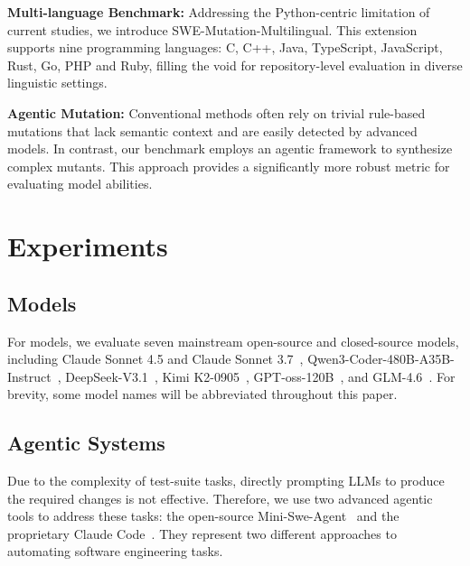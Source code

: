 \documentclass[11pt]{article}
\begin{document}
\textbf{Multi-language Benchmark:} Addressing the Python-centric limitation of current studies, we introduce SWE-Mutation-Multilingual. This extension supports nine programming languages: C, C++, Java, TypeScript, JavaScript, Rust, Go, PHP and Ruby, filling the void for repository-level evaluation in diverse linguistic settings.

\textbf{Agentic Mutation:} Conventional methods often rely on trivial rule-based mutations that lack semantic context and are easily detected by advanced models. In contrast, our benchmark employs an agentic framework to synthesize complex mutants. This approach provides a significantly more robust metric for evaluating model abilities.

\section{Experiments}

\subsection{Models} 
For models, we evaluate seven mainstream open-source and closed-source models, including Claude Sonnet 4.5 and Claude Sonnet 3.7~\citep{anthropic2025claude},
Qwen3-Coder-480B-A35B-Instruct~\citep{qwen3technicalreport}, DeepSeek-V3.1~\citep{deepseek2025v31}, Kimi K2-0905~\citep{kimiteam2025kimik2openagentic}, GPT-oss-120B~\citep{openai2025gptoss120bgptoss20bmodel},
and GLM-4.6~\citep{zhipuai2025glm46}. For brevity, some model names will be abbreviated throughout this paper.

\subsection{Agentic Systems} 
Due to the complexity of test-suite tasks, directly prompting LLMs to produce the required changes is not effective. Therefore, we use two advanced agentic tools to address these tasks: the open-source Mini-Swe-Agent~\citep{yang2024sweagent} and the proprietary Claude Code~\citep{anthropic2025claude}. They represent two different approaches to automating software engineering tasks.
\end{document}
